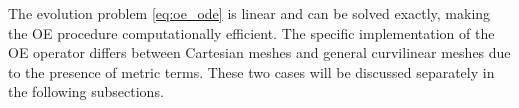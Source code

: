 \documentclass[fleqn,11pt]{amsart}
\begin{document}
The evolution problem \eqref{eq:oe_ode} is linear and can be solved
exactly, making the OE procedure computationally efficient.
The specific implementation of the OE operator differs between
Cartesian meshes and general curvilinear meshes due to the presence
of metric terms. These two cases will be discussed separately in the
following subsections.

\end{document}
